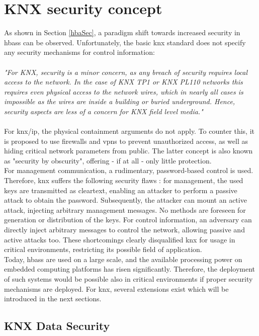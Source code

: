 \section{KNX security concept}
As shown in Section \ref{hbaSec}, a paradigm shift towards increased security in \glspl{hbas} can be observed. 
Unfortunately, the basic \gls{knx} standard does not specify any security mechanisms for control information:
\\
\\
\textit{"For KNX, security is a minor concern, as any breach of security requires local access to the network. 
In the case of KNX TP1 or KNX PL110 networks this requires even physical access to the network wires,
which in nearly all cases is impossible as the wires are inside a building or buried underground.
Hence, security aspects are less of a concern for KNX field level media."} \cite{knxSpec}
\\
\\
For \gls{knx}/\gls{ip}, the physical containment arguments do not apply. To counter this, it is proposed to use firewalls and \glspl{vpn} to prevent unauthorized access,
as well as hiding critical network parameters from public. The latter concept is also known as "security by obscurity", offering - if at all - only 
little protection.
\\
For management communication, a rudimentary, password-based control is used. Therefore, \gls{knx} suffers the following security flaws 
\cite{Granzer05securityin}: for management, the 
used keys are transmitted as cleartext, enabling an attacker to perform a passive attack to obtain the password. Subsequently, the attacker can mount an active
attack, injecting
arbitrary management messages. No methods are foreseen for generation or distribution of the keys.
For control information, an adversary can directly inject arbitrary messages to control the network, allowing passive and active attacks too.
These shortcomings clearly disqualified \gls{knx} for usage in critical environments, restricting its possible field of application.
\\
Today, \glspl{hbas} are used on a large scale, and the available processing power on embedded computing platforms has risen significantly. Therefore, the deployment
of such systems would be possible also in critical environments if proper security mechanisms are deployed. For \gls{knx}, several extensions
exist which will be introduced in the next sections.

\subsection{KNX Data Security}


